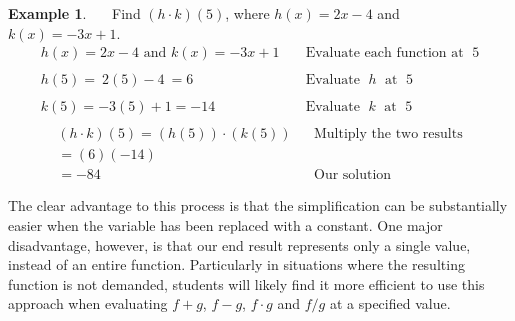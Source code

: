 \documentclass[12pt]{book}
\theoremstyle{definition}
\newtheorem{example}{Example}
\newcommand{\tmop}[1]{\ensuremath{\operatorname{#1}}}
\begin{document}
\begin{example}~~~Find $(h \cdot k) (5)$, where $h (x) = 2 x - 4$ and $k (x) = - 3 x + 1$.
  \begin{eqnarray*}
    h (x) = 2 x - 4 \text{~and~} k (x) = - 3 x + 1  &  & \tmop{Evaluate~each~function~at~} 5\\
    &  & \\
    h (5) = ~2 (5) - 4~=6~~~~ &  & \tmop{Evaluate~} h \tmop{~at~} 5\\
    &  & \\
    k (5) = - 3 (5) + 1=-14 &  & \tmop{Evaluate~} k \tmop{~at~} 5\\
\end{eqnarray*}
\begin{eqnarray*}
		(h \cdot k) (5)=\left(h (5)\right)\cdot\left(k (5)\right) &  & \tmop{Multiply~the~two~results}\\
    =(6) (- 14)~~~~~~ &  & \\
    =- 84~~~~~~~~~~~~ &  & \text{Our solution}
  \end{eqnarray*}
\end{example}
The clear advantage to this process is that the simplification can be substantially easier when the variable has been replaced with a constant.  One major disadvantage, however, is that our end result represents only a single value, instead of an entire function.  Particularly in situations where the resulting function is not demanded, students will likely find it more efficient to use this approach when evaluating $f+g$, $f-g$, $f\cdot g$ and $f/g$ at a specified value.
\end{document}
